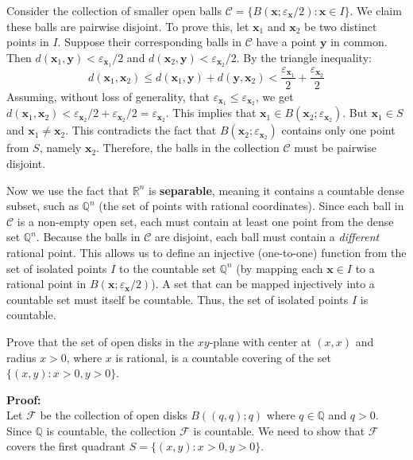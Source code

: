 Consider the collection of smaller open balls $\mathcal{C} = \{ B(\mathbf{x}; \varepsilon_{\mathbf{x}}/2) : \mathbf{x} \in I \}$. We claim these balls are pairwise disjoint.
To prove this, let $\mathbf{x}_1$ and $\mathbf{x}_2$ be two distinct points in $I$. Suppose their corresponding balls in $\mathcal{C}$ have a point $\mathbf{y}$ in common. Then $d(\mathbf{x}_1, \mathbf{y}) < \varepsilon_{\mathbf{x}_1}/2$ and $d(\mathbf{x}_2, \mathbf{y}) < \varepsilon_{\mathbf{x}_2}/2$.
By the triangle inequality:
$$d(\mathbf{x}_1, \mathbf{x}_2) \le d(\mathbf{x}_1, \mathbf{y}) + d(\mathbf{y}, \mathbf{x}_2) < \frac{\varepsilon_{\mathbf{x}_1}}{2} + \frac{\varepsilon_{\mathbf{x}_2}}{2}$$
Assuming, without loss of generality, that $\varepsilon_{\mathbf{x}_1} \le \varepsilon_{\mathbf{x}_2}$, we get $d(\mathbf{x}_1, \mathbf{x}_2) < \varepsilon_{\mathbf{x}_2}/2 + \varepsilon_{\mathbf{x}_2}/2 = \varepsilon_{\mathbf{x}_2}$.
This implies that $\mathbf{x}_1 \in B(\mathbf{x}_2; \varepsilon_{\mathbf{x}_2})$. But $\mathbf{x}_1 \in S$ and $\mathbf{x}_1 \neq \mathbf{x}_2$. This contradicts the fact that $B(\mathbf{x}_2; \varepsilon_{\mathbf{x}_2})$ contains only one point from $S$, namely $\mathbf{x}_2$.
Therefore, the balls in the collection $\mathcal{C}$ must be pairwise disjoint.

Now we use the fact that $\mathbb{R}^n$ is \textbf{separable}, meaning it contains a countable dense subset, such as $\mathbb{Q}^n$ (the set of points with rational coordinates).
Since each ball in $\mathcal{C}$ is a non-empty open set, each must contain at least one point from the dense set $\mathbb{Q}^n$. Because the balls in $\mathcal{C}$ are disjoint, each ball must contain a \textit{different} rational point.
This allows us to define an injective (one-to-one) function from the set of isolated points $I$ to the countable set $\mathbb{Q}^n$ (by mapping each $\mathbf{x} \in I$ to a rational point in $B(\mathbf{x}; \varepsilon_{\mathbf{x}}/2)$). A set that can be mapped injectively into a countable set must itself be countable.
Thus, the set of isolated points $I$ is countable.

\begin{problembox}
Prove that the set of open disks in the \(xy\)-plane with center at \( (x, x) \) and radius \( x > 0 \), where \( x \) is rational, is a countable covering of the set \( \{(x, y) : x > 0, y > 0\} \).
\end{problembox}

\textbf{Proof:}\\
Let $\mathcal{F}$ be the collection of open disks $B((q,q); q)$ where $q \in \mathbb{Q}$ and $q > 0$. Since $\mathbb{Q}$ is countable, the collection $\mathcal{F}$ is countable. We need to show that $\mathcal{F}$ covers the first quadrant $S = \{(x, y) : x > 0, y > 0\}$.

